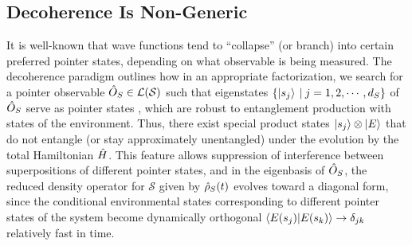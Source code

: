\documentclass[aps,pra,onecolumn,nofootinbib,12pt,tightenlines]{revtex4-1}
\begin{document}
\subsection{Decoherence Is Non-Generic}
\label{sec:decoherence_feature}
 
It is well-known that wave functions tend to ``collapse'' (or branch) into certain preferred pointer states, depending on what observable is being measured. The decoherence paradigm outlines how in an appropriate factorization, we search for a  {pointer observable} $\hat{O}_{S} \in \mathcal{L}(\mathcal{S}) $ such that eigenstates $\{\ket{s_{j}} \: | \: j = 1,2,\cdots,d_{S} \}$ of $\hat{O}_{S}$   serve as  {pointer states} \cite{Zurek:1981xq}, which are robust to entanglement production with states of the environment. Thus, there exist special product states $\ket{s_{j}} \otimes \ket{E}$ that do not entangle (or stay approximately unentangled) under the evolution by the total Hamiltonian $\hat{H}$. This feature allows suppression of interference between superpositions of different pointer states, and in the eigenbasis of $\hat{O}_{S}$, the reduced density operator for $\mathcal{S}$ given by $\hat{\rho}_{S}(t)$ evolves toward a diagonal form, since the conditional environmental states corresponding to different pointer states of the system become  {dynamically} orthogonal $\braket{E(s_j)|E(s_{k})} \to \delta_{jk}$ relatively fast in time. 
\end{document}
